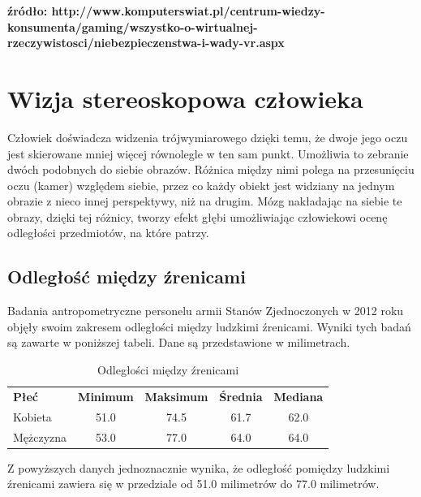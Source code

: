 \documentclass[a4paper,11pt,twoside]{report}
\theoremstyle{definition}
\begin{document}
\textbf {źródło: http://www.komputerswiat.pl/centrum-wiedzy-konsumenta/gaming/wszystko-o-wirtualnej-rzeczywistosci/niebezpieczenstwa-i-wady-vr.aspx }

\section{Wizja stereoskopowa człowieka}

Człowiek doświadcza widzenia trójwymiarowego dzięki temu, że dwoje jego oczu jest skierowane mniej więcej równolegle w ten sam punkt. Umożliwia to zebranie dwóch podobnych do siebie obrazów. Różnica między nimi polega na przesunięciu oczu (kamer) względem siebie, przez co każdy obiekt jest widziany na jednym obrazie z nieco innej perspektywy, niż na drugim. Mózg nakładając na siebie te obrazy, dzięki tej różnicy, tworzy efekt głębi umożliwiając człowiekowi ocenę odległości przedmiotów, na które patrzy.

\subsection{Odległość między źrenicami}

Badania antropometryczne personelu armii Stanów Zjednoczonych w 2012 roku\cite{IPdistance} objęły swoim zakresem odległości między ludzkimi źrenicami. Wyniki tych badań są zawarte w poniższej tabeli. Dane są przedstawione w milimetrach.

\begin{table}[h!]
\centering
\label{my-label}
\begin{tabular}{lcccc}
\textbf{Płeć} & \multicolumn{1}{l}{\textbf{Minimum}} & \multicolumn{1}{l}{\textbf{Maksimum}} & \multicolumn{1}{l}{\textbf{Średnia}} & \multicolumn{1}{l}{\textbf{Mediana}} \\
Kobieta       & 51.0                                 & 74.5                                  & 61.7                                 & 62.0                                 \\
Mężczyzna     & 53.0                                 & 77.0                                  & 64.0                                 & 64.0                                
\end{tabular}
\caption{Odległości między źrenicami}
\end{table}

Z powyższych danych jednoznacznie wynika, że odległość pomiędzy ludzkimi źrenicami zawiera się w przedziale od 51.0 milimetrów do 77.0 milimetrów.
\end{document}
